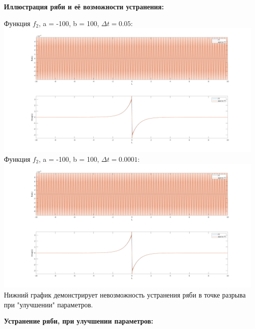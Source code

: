 \documentclass[11pt]{article}
\begin{document}
	\newpage
	{\hspace{-1cm} \bf Иллюстрация ряби и её возможности устранения:}
	\begin{center}
		{Функция $f_2$, a = -100, b = 100, $\Delta t = 0.05$:}
		\newline
		\includegraphics[width=1\textwidth]{ryab_1.png}\\
		{Функция $f_2$, a = -100, b = 100, $\Delta t = 0.0001$:}
		\newline
		\includegraphics[width=1\textwidth]{nalf_2.png}\\
		{Нижний график демонстрирует невозможность устранения ряби в точке разрыва при "улучшении" параметров.}
	\end{center}		
	\newpage
		{\hspace{-1cm} \bf Устранение ряби, при улучшении параметров:}
\end{document}
